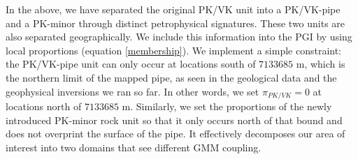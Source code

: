 \documentclass[paper, twocolumn]{geophysics} %
\begin{document}

In the above, we have separated the original PK/VK unit into a PK/VK-pipe and a PK-minor through distinct petrophysical signatures. These two units are also separated geographically. We include this information into the PGI by using local proportions (equation \ref{membership}). We implement a simple constraint: the PK/VK-pipe unit can only occur at locations south of $7133685$ m, which is the northern limit of the mapped pipe, as seen in the geological data and the geophysical inversions we ran so far. In other words, we set $\pi_{PK/VK}=0$ at locations north of $7133685$ m. Similarly, we set the proportions of the newly introduced PK-minor rock unit so that it only occurs north of that bound and does not overprint the surface of the pipe. It effectively decomposes our area of interest into two domains that see different GMM coupling.

\end{document}
